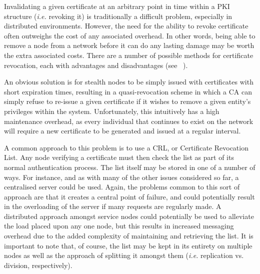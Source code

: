 \documentclass[times, 10pt,twocolumn]{article}
\begin{document}
\label{subsect-revocation}

Invalidating a given certificate at an arbitrary point in time within
a PKI structure (\emph{i.e.} revoking it) is traditionally a difficult
problem, especially in distributed environments. However, the need for
the ability to revoke certificate often outweighs the cost of any
associated overhead. In other words, being able to remove a node from a
network before it can do any lasting damage may be worth the extra
associated costs. There are a number of possible methods for
certificate revocation, each with advantages and disadvantages (see
~\cite{Zheng03Tradeoffs}).

An obvious solution is for stealth nodes to be simply issued with
certificates with short expiration times, resulting in a
quasi-revocation scheme in which a CA can simply refuse to re-issue a
given certificate if it wishes to remove a given entity's privileges
within the system. Unfortunately, this intuitively has a high
maintenance overhead, as every individual that continues to exist on
the network will require a new certificate to be generated and issued
at a regular interval.

A common approach to this problem is to use a CRL, or Certificate
Revocation List. Any node verifying a certificate must then check the
list as part of its normal authentication process. The list itself may
be stored in one of a number of ways. For instance, and as with many of
the other issues considered so far, a centralised server could be used.
Again, the problems common to this sort of approach are that it creates
a central point of failure, and could potentially result in the
overloading of the server if many requests are regularly made. A
distributed approach amongst service nodes could potentially be used to
alleviate the load placed upon any one node, but this results in
increased messaging overhead due to the added complexity of maintaining
and retrieving the list. It is important to note that, of course, the
list may be kept in its entirety on multiple nodes as well as the
approach of splitting it amongst them (\emph{i.e.} replication vs.
division, respectively).

\end{document}
